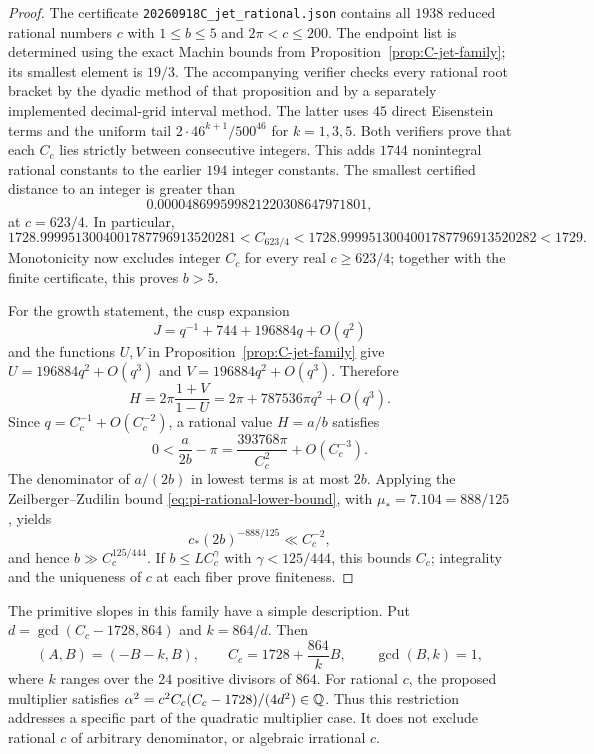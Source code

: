 \begin{proof}
The certificate \texttt{20260918C\_jet\_rational.json} contains all
$1938$ reduced rational numbers $c$ with $1\le b\le5$ and
$2\pi<c\le200$. The endpoint list is determined using the exact Machin
bounds from Proposition~\ref{prop:C-jet-family}; its smallest element
is $19/3$. The accompanying verifier checks every rational root bracket
by the dyadic method of that proposition and by a separately implemented
decimal-grid interval method. The latter uses $45$ direct Eisenstein
terms and the uniform tail $2\cdot46^{k+1}/500^{46}$ for $k=1,3,5$.
Both verifiers prove that each $C_c$ lies strictly between consecutive
integers. This adds $1744$ nonintegral rational constants to the earlier
$194$ integer constants. The smallest certified distance to an integer
is greater than
\[
 0.000048699599821220308647971801,
\]
at $c=623/4$. In particular,
\[
 1728.9999513004001787796913520281<C_{623/4}
 <1728.9999513004001787796913520282<1729.
\]
Monotonicity now excludes integer $C_c$ for every real $c\ge623/4$;
together with the finite certificate, this proves $b>5$.

For the growth statement, the cusp expansion
\[
 J=q^{-1}+744+196884q+O(q^2)
\]
and the functions $U,V$ in Proposition~\ref{prop:C-jet-family} give
$U=196884q^2+O(q^3)$ and $V=196884q^2+O(q^3)$. Therefore
\[
 H=2\pi\frac{1+V}{1-U}
   =2\pi+787536\pi q^2+O(q^3).
\]
Since $q=C_c^{-1}+O(C_c^{-2})$, a rational value $H=a/b$ satisfies
\[
 0<\frac{a}{2b}-\pi
   =\frac{393768\pi}{C_c^2}+O(C_c^{-3}).
\]
The denominator of $a/(2b)$ in lowest terms is at most $2b$.
Applying the Zeilberger--Zudilin bound
\eqref{eq:pi-rational-lower-bound}, with $\mu_*=7.104=888/125$, yields
\[
 c_*(2b)^{-888/125}\ll C_c^{-2},
\]
and hence $b\gg C_c^{125/444}$. If
$b\le L C_c^\gamma$ with $\gamma<125/444$, this bounds $C_c$;
integrality and the uniqueness of $c$ at each fiber prove finiteness.
\end{proof}

The primitive slopes in this family have a simple description. Put
$d=\gcd(C_c-1728,864)$ and $k=864/d$. Then
\[
 (A,B)=(-B-k,B),\qquad
 C_c=1728+\frac{864}{k}B,\qquad \gcd(B,k)=1,
\]
where $k$ ranges over the $24$ positive divisors of $864$.
For rational $c$, the proposed multiplier satisfies
$\alpha^2=c^2C_c(C_c-1728)/(4d^2)\in\mathbb Q$.
Thus this restriction addresses a specific part of the quadratic
multiplier case. It does not exclude rational $c$ of arbitrary
denominator, or algebraic irrational $c$.

